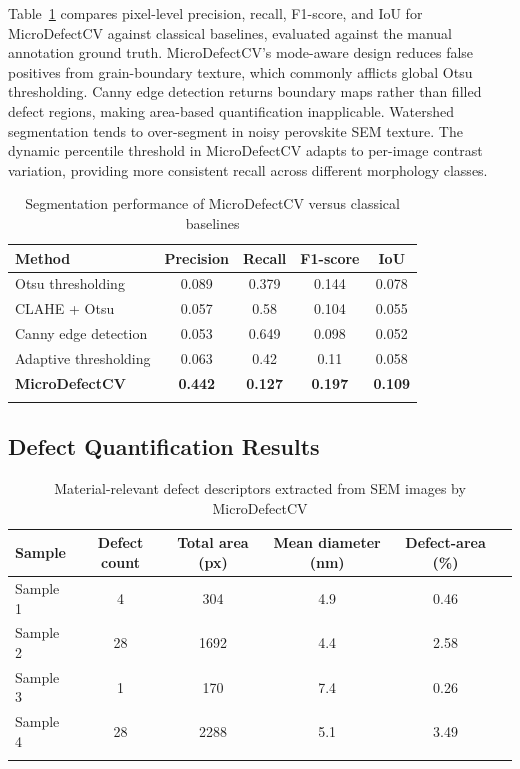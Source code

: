 \documentclass[pdflatex,sn-mathphys-num,iicol]{sn-jnl}
\theoremstyle{thmstyleone}
\theoremstyle{thmstyletwo}
\theoremstyle{thmstylethree}
\begin{document}
Table~\ref{tab:segmentation_metrics} compares pixel-level precision,
recall, F1-score, and IoU for MicroDefectCV against classical
baselines, evaluated against the manual annotation ground truth.
MicroDefectCV's mode-aware design reduces false positives from
grain-boundary texture, which commonly afflicts global Otsu
thresholding. Canny edge detection returns boundary maps rather
than filled defect regions, making area-based quantification
inapplicable. Watershed segmentation tends to over-segment in
noisy perovskite SEM texture. The dynamic percentile threshold in
MicroDefectCV adapts to per-image contrast variation, providing
more consistent recall across different morphology classes.

\begin{table}[!htbp]
\centering
\caption{Segmentation performance of MicroDefectCV versus classical baselines}
\label{tab:segmentation_metrics}
\begin{tabular}{@{}lcccc@{}}
\toprule
Method & Precision & Recall & F1-score & IoU \\
\midrule
Otsu thresholding & 0.089 & 0.379 & 0.144 & 0.078 \\
CLAHE + Otsu & 0.057 & 0.58 & 0.104 & 0.055 \\
Canny edge detection & 0.053 & 0.649 & 0.098 & 0.052 \\
Adaptive thresholding & 0.063 & 0.42 & 0.11 & 0.058 \\
\textbf{MicroDefectCV} & \textbf{0.442} & \textbf{0.127} & \textbf{0.197} & \textbf{0.109} \\
\botrule
\end{tabular}
\end{table}

\subsection{Defect Quantification Results}
\label{subsec:defect_quantification_results}

\begin{table}[!htbp]
\caption{Material-relevant defect descriptors extracted from SEM images by MicroDefectCV}
\label{tab:defect_descriptors}
\begin{tabular}{@{}lccccc@{}}
\toprule
Sample & Defect count & Total area (px) & Mean diameter (nm) & Defect-area (\%) \\
\midrule
Sample 1 & 4 & 304 & 4.9 & 0.46 \\
Sample 2 & 28 & 1692 & 4.4 & 2.58 \\
Sample 3 & 1 & 170 & 7.4 & 0.26 \\
Sample 4 & 28 & 2288 & 5.1 & 3.49 \\
\botrule
\end{tabular}
\end{table}
\end{document}
